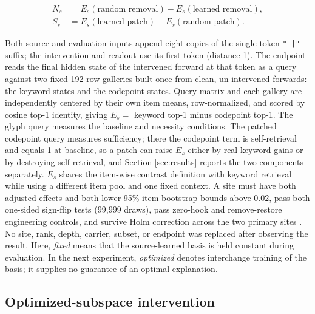 \documentclass{article}
\begin{document}
\begin{align}
N_s &= E_s(\text{random removal})-E_s(\text{learned removal}),\\
S_s &= E_s(\text{learned patch})-E_s(\text{random patch}).
\end{align}

Both source and evaluation inputs append eight copies of the single-token
\texttt{" |"} suffix; the intervention and readout use its first token
(distance 1). The endpoint reads the final hidden state of the intervened
forward at that token as a query against two fixed 192-row galleries built
once from clean, un-intervened forwards: the keyword states and the codepoint
states. Query matrix and each gallery are independently centered by their own
item means, row-normalized, and scored by cosine top-1 identity, giving
$E_s=$ keyword top-1 minus codepoint top-1. The glyph query measures the
baseline and necessity conditions. The patched codepoint query measures
sufficiency; there the codepoint term is self-retrieval and equals 1 at
baseline, so a patch can raise $E_s$ either by real keyword gains or by
destroying self-retrieval, and Section \ref{sec:results} reports the two
components separately. $E_s$ shares the item-wise contrast definition with
keyword retrieval while using a different item pool and one fixed context. A site must
have both adjusted effects and both lower 95\%
item-bootstrap bounds above $0.02$, pass both one-sided sign-flip tests
(99,999 draws), pass zero-hook and remove-restore engineering controls, and
survive Holm correction across the two primary sites
\citep{holm1979sequential}. No site, rank, depth, carrier, subset, or endpoint
was replaced after observing the result.
Here, \emph{fixed} means that the source-learned basis is held constant during
evaluation. In the next experiment, \emph{optimized} denotes interchange
training of the basis; it supplies no guarantee of an optimal explanation.

\subsection{Optimized-subspace intervention}
\label{sec:t20}
\end{document}
